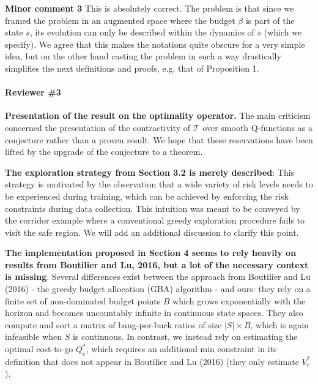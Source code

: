 \documentclass{article}
\begin{document}

\textbf{Minor comment 3} This is absolutely correct. The problem is that since we framed the problem in an augmented space where the budget $\beta$ is part of the state $\overline{s}$, its evolution can only be described within the dynamics of $\overline{s}$ (which we specify). We agree that this makes the notations quite obscure for a very simple idea, but on the other hand casting the problem in such a way drastically simplifies the next definitions and proofs, e.g. that of Proposition 1.

\paragraph{\large Reviewer \#3}

\textbf{Presentation of the result on the optimality operator.} The main criticism concerned the presentation of the contractivity of $\mathcal{T}$ over smooth Q-functions as a conjecture rather than a proven result. We hope that these reservations have been lifted by the upgrade of the conjecture to a theorem.

\textbf{The exploration strategy from Section 3.2 is merely described}: This strategy is motivated by the observation that a wide variety of risk levels needs to be experienced during training, which can be achieved by enforcing the risk constraints during data collection. This intuition was meant to be conveyed by the corridor example where a conventional greedy exploration procedure fails to visit the safe region. We will add an additional discussion to clarify this point.

\textbf{The implementation proposed in Section 4 seems to rely heavily on results from Boutilier and Lu, 2016, but a lot of the necessary context is missing}. Several differences exist between the approach from Boutilier and Lu (2016)  - the greedy budget allocation (GBA) algorithm - and ours: they rely on a finite set of non-dominated budget points $B$ which grows exponentially with the horizon and becomes uncountably infinite in continuous state spaces. They also compute and sort a matrix of bang-per-buck ratios of size $|S|\times B$, which is again infeasible when $S$ is continuous. In contrast, we instead rely on estimating the optimal cost-to-go $Q_c^*$, which requires an additional min constraint in its definition that does not appear in Boutilier and Lu (2016) (they only estimate $V_r^*$).
\end{document}
